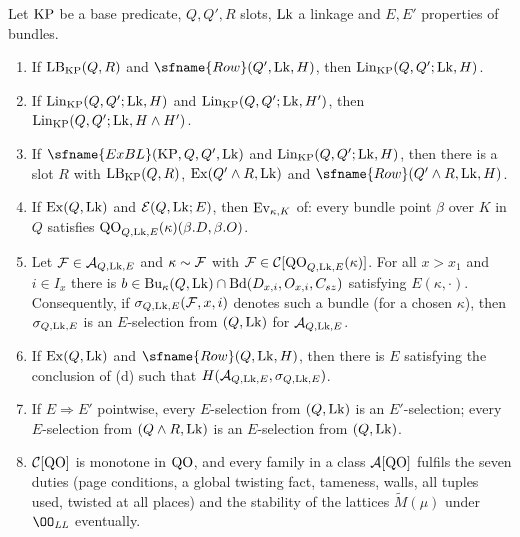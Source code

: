 \begin{lemma}\label{pf:stageU:rowcalc}
Let $\mathrm{KP}$ be a base predicate, $Q,Q',R$ slots, $\mathrm{Lk}$ a linkage and $E,E'$ properties of bundles.
\begin{enumerate}[label=(\alph*)]
\item If $\mathrm{LB}_{\mathrm{KP}}(Q,R)$ and $\sfname{Row}(Q',\stageULk,H)$, then $\mathrm{Lin}_{\mathrm{KP}}(Q,Q';\mathrm{Lk},H)$.
\item If $\mathrm{Lin}_{\mathrm{KP}}(Q,Q';\mathrm{Lk},H)$ and $\mathrm{Lin}_{\mathrm{KP}}(Q,Q';\mathrm{Lk},H')$, then
$\mathrm{Lin}_{\mathrm{KP}}(Q,Q';\mathrm{Lk},H\wedge H')$.
\item If $\sfname{ExBL}(\stageUKP,Q,Q',\stageULk)$ and $\mathrm{Lin}_{\mathrm{KP}}(Q,Q';\mathrm{Lk},H)$, then there is a slot $R$ with
$\mathrm{LB}_{\mathrm{KP}}(Q,R)$, $\mathrm{Ex}(Q'\mathbin{\wedge} R,\mathrm{Lk})$ and $\sfname{Row}(Q'\stageUand R,\stageULk,H)$.
\item If $\mathrm{Ex}(Q,\mathrm{Lk})$ and $\mathcal{E}(Q,\mathrm{Lk};E)$, then $\mathrm{Ev}_{\kappa,K}$ of: every bundle point $\beta$ over
$K$ in $Q$ satisfies $\mathrm{QO}_{Q,\mathrm{Lk},E}(\kappa)(\beta.D,\beta.O)$.
\item Let $\mathcal{F}\in\mathcal{A}_{Q,\mathrm{Lk},E}$ and $\kappa\sim\mathcal{F}$ with $\mathcal{F}\in\mathcal{C}[\mathrm{QO}_{Q,\mathrm{Lk},E}(\kappa)]$.
For all $x>x_1$ and $i\in I_x$ there is $b\in\mathrm{Bu}_\kappa(Q,\mathrm{Lk})\cap\mathrm{Bd}(D_{x,i},O_{x,i},C_{sz})$ satisfying
$E(\kappa,\cdot)$. Consequently, if $\sigma_{Q,\mathrm{Lk},E}(\mathcal{F},x,i)$ denotes such a bundle (for a chosen $\kappa$), then
$\sigma_{Q,\mathrm{Lk},E}$ is an $E$-selection from $(Q,\mathrm{Lk})$ for $\mathcal{A}_{Q,\mathrm{Lk},E}$.
\item If $\mathrm{Ex}(Q,\mathrm{Lk})$ and $\sfname{Row}(Q,\stageULk,H)$, then there is $E$ satisfying the conclusion of
\textup{(d)} such that $H(\mathcal{A}_{Q,\mathrm{Lk},E},\sigma_{Q,\mathrm{Lk},E})$.
\item If $E\Rightarrow E'$ pointwise, every $E$-selection from $(Q,\mathrm{Lk})$ is an $E'$-selection; every $E$-selection
from $(Q\mathbin{\wedge} R,\mathrm{Lk})$ is an $E$-selection from $(Q,\mathrm{Lk})$.
\item $\mathcal{C}[\mathrm{QO}]$ is monotone in $\mathrm{QO}$, and every family in a class $\mathcal{A}[\mathrm{QO}]$ fulfils the seven
duties (page conditions, a global twisting fact, tameness, walls, all tuples used, twisted at all places) and the
stability of the lattices $\widetilde M(\mu)$ under $\OO_{\mathit{LL}}$ eventually.
\end{enumerate}
\end{lemma}

